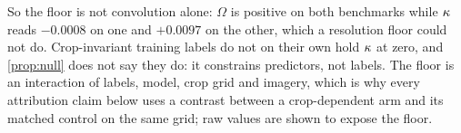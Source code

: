 So the floor is not convolution alone: $\Omega$ is positive
on both benchmarks while $\kappa$ reads $-0.0008$ on one and $+0.0097$ on the other,
which a resolution floor could not do. Crop-invariant training labels do not on their
own hold $\kappa$ at zero, and \cref{prop:null} does not say they do: it constrains
predictors, not labels. The floor is an interaction of labels, model, crop grid and
imagery, which is why every attribution claim below uses a contrast between a
crop-dependent arm and its matched control on the same grid; raw values are shown to
expose the floor.
